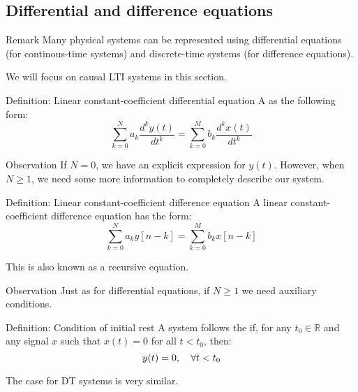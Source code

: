 \documentclass[a4paper]{article}
\begin{document}
\subsection{Differential and difference equations}
\begin{parag}{Remark}
    Many physical systems can be represented using differential equations (for continous-time systems) and discrete-time systems (for difference equations).

    We will focus on causal LTI systems in this section.
\end{parag}

\begin{parag}{Definition: Linear constant-coefficient differential equation}
    A  as the following form: 
    \[\sum_{k=0}^{N} a_k \frac{d^{k}y\left(t\right)}{dt^{k}} = \sum_{k=0}^{M} b_k \frac{d^{k}x\left(t\right)}{dt^{k}} \]
    
    \begin{subparag}{Observation}
        If $N=0$, we have an explicit expression for $y\left(t\right)$. However, when $N \geq 1$, we need some more information to completely describe our system.
    \end{subparag}
\end{parag}

\begin{parag}{Definition: Linear constant-coefficient difference equation}
    A linear constant-coefficient difference equation has the form: 
    \[\sum_{k=0}^{N} a_k y\left[n-k\right] = \sum_{k=0}^{M} b_k x\left[n-k\right]\]
    
    This is also known as a recursive equation.

    \begin{subparag}{Observation}
        Just as for differential equations, if $N \geq 1$ we need auxiliary conditions.
    \end{subparag}
\end{parag}

\begin{parag}{Definition: Condition of initial rest}
    A system follows the  if, for any $t_0 \in \mathbb{R}$ and any signal $x$ such that $x\left(t\right) = 0$ for all $t < t_0$, then: 
    \[y\left(t\right) = 0, \mathspace \forall t < t_0\]

    The case for DT systems is very similar.
\end{parag}
\end{document}
